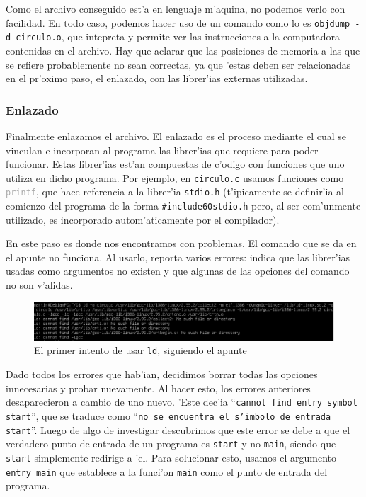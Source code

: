 \documentclass[11pt]{article}
\begin{document}
		Como el archivo conseguido est'a en lenguaje m'aquina, no podemos verlo con facilidad. En todo caso, podemos hacer uso de un comando como lo es \texttt{objdump -d circulo.o}, que intepreta y permite ver las instrucciones a la computadora contenidas en el archivo. Hay que aclarar que las posiciones de memoria a las que se refiere probablemente no sean correctas, ya que 'estas deben ser relacionadas en el pr'oximo paso, el enlazado, con las librer'ias externas utilizadas.
		
	\subsubsection{Enlazado}
		Finalmente enlazamos el archivo. El enlazado es el proceso mediante el cual se vinculan e incorporan al programa las librer'ias que requiere para poder funcionar. Estas librer'ias est'an compuestas de c'odigo con funciones que uno utiliza en dicho programa. Por ejemplo, en \texttt{circulo.c} usamos funciones como \texttt{\textcolor{darkgray}{printf}}, que hace referencia a la librer'ia \texttt{stdio.h} (t'ipicamente se definir'ia al comienzo del programa de la forma \texttt{\textcolor{fuchsia-vim}{\#include}\textcolor{orange-desert-vim}{\char60stdio.h}} pero, al ser com'unmente utilizado, es incorporado autom'aticamente por el compilador).
		
		En este paso es donde nos encontramos con problemas. El comando que se da en el apunte no funciona. Al usarlo, reporta varios errores: indica que las librer'ias usadas como argumentos no existen y que algunas de las opciones del comando no son v'alidas.
	
		\begin{figure}[H]
			\centering
			\includegraphics[width=.9\linewidth]{Images/Seccion 1/S1 parte cinco}
			\caption{El primer intento de usar \texttt{ld}, siguiendo el apunte}
			\label{fig:first-ld-attempt}
		\end{figure}
		
		Dado todos los errores que hab'ian, decidimos borrar todas las opciones innecesarias y probar nuevamente. Al hacer esto, los errores anteriores desaparecieron a cambio de uno nuevo. 'Este dec'ia ``\texttt{cannot find entry symbol \textunderscore\/start}'', que se traduce como ``\texttt{no se encuentra el s'imbolo de entrada \textunderscore\/start}''. Luego de algo de investigar descubrimos que este error se debe a que el verdadero punto de entrada\footnotemark\/ de un programa es \texttt{\textunderscore\/start} y no \texttt{main}, siendo que \texttt{\textunderscore\/start} simplemente redirige a 'el. Para solucionar esto, usamos el argumento \texttt{--entry main} que establece a la funci'on \texttt{main} como el punto de entrada del programa.
		
\end{document}

